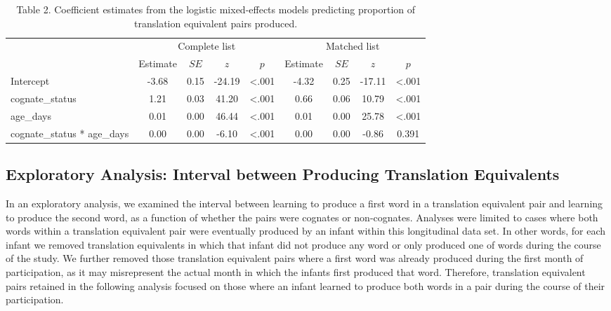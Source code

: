 \documentclass[
  ,man,floatsintext]{apa6}
\begin{document}
\begin{table}[tbp]

\begin{center}
\begin{threeparttable}

\caption{\label{tab:Table 2}Table 2. Coefficient estimates from the logistic mixed-effects models predicting proportion of translation equivalent pairs produced.}

\begin{tabular}{lcccccccc}
\toprule
 & \multicolumn{4}{c}{Complete list} & \multicolumn{4}{c}{Matched list} \\
\cmidrule(r){2-5} \cmidrule(r){6-9}
 & Estimate & $SE$ & $z$ & $p$ & Estimate & $SE$ & $z$ & $p$\\
\midrule
Intercept & -3.68 & 0.15 & -24.19 & <.001 & -4.32 & 0.25 & -17.11 & <.001\\
cognate\_status & 1.21 & 0.03 & 41.20 & <.001 & 0.66 & 0.06 & 10.79 & <.001\\
age\_days & 0.01 & 0.00 & 46.44 & <.001 & 0.01 & 0.00 & 25.78 & <.001\\
cognate\_status * age\_days & 0.00 & 0.00 & -6.10 & <.001 & 0.00 & 0.00 & -0.86 & 0.391\\
\bottomrule
\end{tabular}

\end{threeparttable}
\end{center}

\end{table}

\hypertarget{exploratory-analysis-interval-between-producing-translation-equivalents}{%
\subsection{Exploratory Analysis: Interval between Producing Translation Equivalents}\label{exploratory-analysis-interval-between-producing-translation-equivalents}}

In an exploratory analysis, we examined the interval between learning to produce a first word in a translation equivalent pair and learning to produce the second word, as a function of whether the pairs were cognates or non-cognates. Analyses were limited to cases where both words within a translation equivalent pair were eventually produced by an infant within this longitudinal data set. In other words, for each infant we removed translation equivalents in which that infant did not produce any word or only produced one of words during the course of the study. We further removed those translation equivalent pairs where a first word was already produced during the first month of participation, as it may misrepresent the actual month in which the infants first produced that word. Therefore, translation equivalent pairs retained in the following analysis focused on those where an infant learned to produce both words in a pair during the course of their participation.
\end{document}
